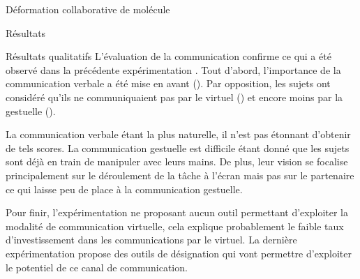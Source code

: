 \documentclass[myfrancais,ngerman,english,frenchb]{mythesis}
\begin{document}
\begin{mychapter}{Déformation collaborative de molécule}
\begin{mysection}{Résultats}
\begin{mysubsection}{Résultats qualitatifs}
				L'évaluation de la communication confirme ce qui a été observé dans la précédente expérimentation .
				Tout d'abord, l'importance de la communication verbale a été mise en avant ().
				Par opposition, les sujets ont considéré qu'ils ne communiquaient pas par le virtuel () et encore moins par la gestuelle ().

				La communication verbale étant la plus naturelle, il n'est pas étonnant d'obtenir de tels scores.
				La communication gestuelle est difficile étant donné que les sujets sont déjà en train de manipuler avec leurs mains.
				De plus, leur vision se focalise principalement sur le déroulement de la tâche à l'écran mais pas sur le partenaire ce qui laisse peu de place à la communication gestuelle.

				Pour finir, l'expérimentation ne proposant aucun outil permettant d'exploiter la modalité de communication virtuelle, cela explique probablement le faible taux d'investissement dans les communications par le virtuel.
				La dernière expérimentation  propose des outils de désignation qui vont permettre d'exploiter le potentiel de ce canal de communication.


\end{mysubsection}
\end{mysection}
\end{mychapter}
\end{document}
